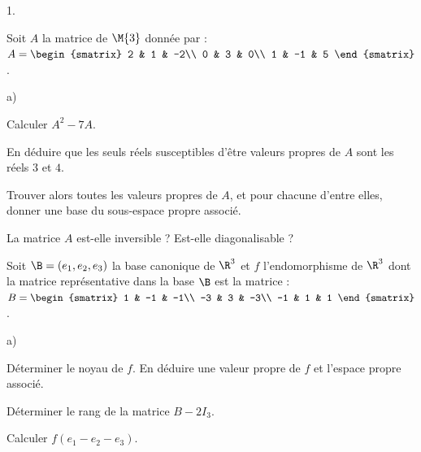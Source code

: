 \documentclass[11pt]{article}%
\begin{document}
\begin{noliste}{1.}
  \setlength{\itemsep}{4mm}
\item Soit $A$ la matrice de $\M{3}$ donnée par : $A =
  \begin{smatrix}
    2 & 1 & -2\\
    0 & 3 & 0\\
    1 & -1 & 5
  \end{smatrix}
  $.
  \begin{noliste}{a)}
    \setlength{\itemsep}{2mm}
  \item Calculer $A^{2}-7A$.

    

  \item En déduire que les seuls réels susceptibles d'être valeurs
    propres de $A$ sont les réels $3$ et $4$.

    




  \item Trouver alors toutes les valeurs propres de $A$, et pour
    chacune d'entre elles, donner une base du sous-espace propre
    associé.

    

  \item La matrice $A$ est-elle inversible ? Est-elle diagonalisable ?

    

  \end{noliste}

\item Soit $\B = (e_{1},e_{2},e_{3})$ la base canonique de $\R^{3}$ et
  $f$ l'endomorphisme de $\R^{3}$ dont la matrice représentative dans
  la base $\B$ est la matrice : $B =
  \begin{smatrix}
    1 & -1 & -1\\
    -3 & 3 & -3\\
    -1 & 1 & 1
  \end{smatrix}
  $.
  \begin{noliste}{a)}
    \setlength{\itemsep}{2mm}
  \item Déterminer le noyau de $f$. En déduire une valeur propre de
    $f$ et l'espace propre associé.

    

  \item Déterminer le rang de la matrice $B-2I_{3}$.

    

  \item Calculer $f(e_{1} - e_{2} - e_{3})$.


\end{noliste}
\end{noliste}
\end{document}
